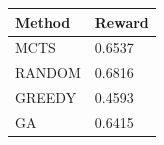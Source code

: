 \begin{tabular}{ll}
\hline
Method & Reward \\
\hline
  MCTS & 0.6537 \\
  RANDOM & 0.6816 \\
  GREEDY & 0.4593 \\
  GA & 0.6415 \\
\hline
\end{tabular}
